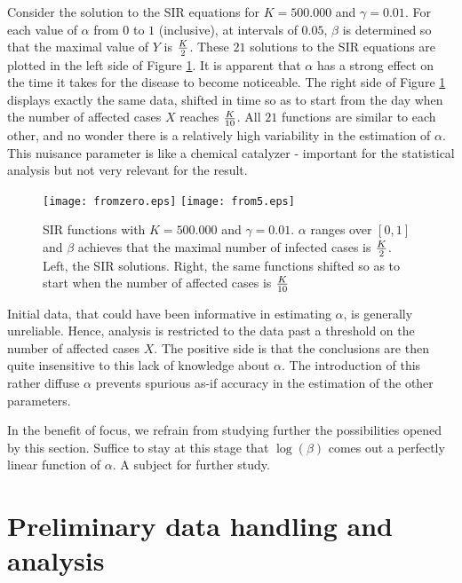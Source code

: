 \documentclass{article}
\begin{document}
Consider the solution to the SIR equations for $K=500.000$ and $\gamma=0.01$. For each value of $\alpha$ from $0$ to $1$ (inclusive), at intervals of $0.05$, $\beta$ is determined so that the maximal value of $Y$ is ${K \over 2}$. These $21$ solutions to the SIR equations are plotted in the left side of Figure \ref{fromtimes}. It is apparent that $\alpha$ has a strong effect on the time it takes for the disease to become noticeable. The right side of Figure \ref{fromtimes} displays exactly the same data, shifted in time so as to start from the day when the number of affected cases $X$ reaches ${K \over 10}$. All $21$ functions are similar to each other, and no wonder there is a relatively high variability in the estimation of $\alpha$. This nuisance parameter is like a chemical catalyzer - important for the statistical analysis but not very relevant for the result.

\begin{figure}
\begin{center}
{\texttt{[image: fromzero.eps]}}
\qquad
{\texttt{[image: from5.eps]}}
\end{center}
\begin{center}
\caption{SIR functions with $K=500.000$ and $\gamma=0.01$. $\alpha$ ranges over $[0,1]$ and $\beta$ achieves that the maximal number of infected cases is ${K \over 2}$. Left, the SIR solutions. Right, the same functions shifted so as to start when the number of affected cases is ${K \over 10}$
}
\label{fromtimes}
\end{center}
\end{figure}


Initial data, that could have been informative in estimating $\alpha$, is generally unreliable. Hence, analysis is restricted to the data past a threshold on the number of affected cases $X$. The positive side is that the conclusions are then quite insensitive to this lack of knowledge about $\alpha$. The introduction of this rather diffuse $\alpha$ prevents spurious as-if accuracy in the estimation of the other parameters.

In the benefit of focus, we refrain from studying further the possibilities opened by this section. Suffice to stay at this stage that $\log(\beta)$ comes out a perfectly linear function of $\alpha$. A subject for further study.

\section{Preliminary data handling and analysis} \label{preliminarysection}
\end{document}
